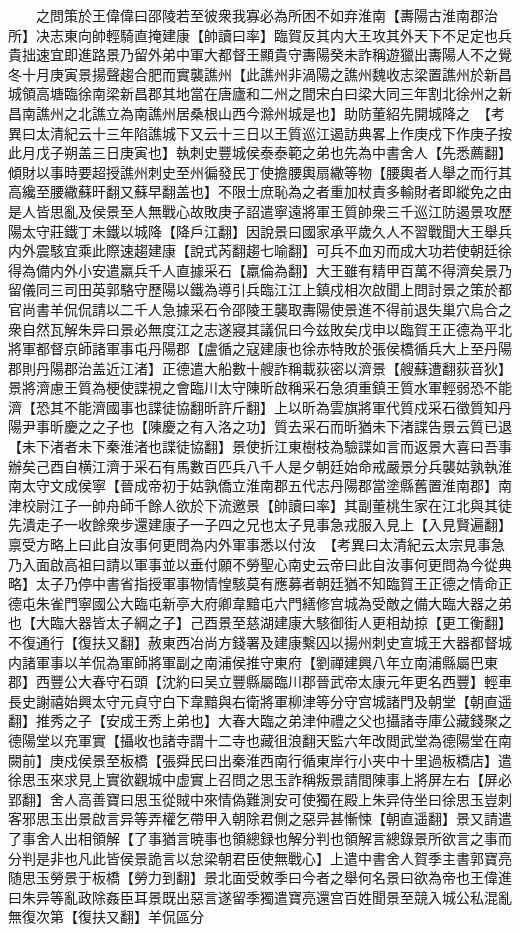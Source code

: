 　　之問策於王偉偉曰邵陵若至彼衆我寡必為所困不如弃淮南【夀陽古淮南郡治所】决志東向帥輕騎直掩建康【帥讀曰率】臨賀反其内大王攻其外天下不足定也兵貴拙速宜即進路景乃留外弟中軍大都督王顯貴守夀陽癸未詐稱遊獵出夀陽人不之覺冬十月庚寅景揚聲趨合肥而實襲譙州【此譙州非渦陽之譙州魏收志梁置譙州於新昌城領高塘臨徐南梁新昌郡其地當在唐廬和二州之間宋白曰梁大同三年割北徐州之新昌南譙州之北譙立為南譙州居桑根山西今滁州城是也】助防董紹先開城降之　【考異曰太清紀云十三年陷譙城下又云十三日以王質巡江遏訪典畧上作庚戍下作庚子按此月戊子朔盖三日庚寅也】執刺史豐城侯泰泰範之弟也先為中書舍人【先悉薦翻】傾財以事時要超授譙州刺史至州徧發民丁使擔腰輿扇繖等物【腰輿者人舉之而行其高纔至腰繖蘇旰翻又蘇早翻盖也】不限士庶恥為之者重加杖責多輸財者即縱免之由是人皆思亂及侯景至人無戰心故敗庚子詔遣寧遠將軍王質帥衆三千巡江防遏景攻歷陽太守莊鐵丁未鐵以城降【降戶江翻】因說景曰國家承平歲久人不習戰聞大王舉兵内外震駭宜乘此際速趨建康【說式芮翻趨七喻翻】可兵不血刃而成大功若使朝廷徐得為備内外小安遣羸兵千人直據采石【羸倫為翻】大王雖有精甲百萬不得濟矣景乃留儀同三司田英郭駱守歷陽以鐵為導引兵臨江江上鎮戍相次啟聞上問討景之策於都官尚書羊侃侃請以二千人急據采石令邵陵王襲取夀陽使景進不得前退失巢穴烏合之衆自然瓦解朱异曰景必無度江之志遂寢其議侃曰今兹敗矣戊申以臨賀王正德為平北將軍都督京師諸軍事屯丹陽郡【盧循之寇建康也徐赤特敗於張侯橋循兵大上至丹陽郡則丹陽郡治盖近江渚】正德遣大船數十艘詐稱載荻密以濟景【艘蘇遭翻荻音狄】景將濟慮王質為梗使諜視之會臨川太守陳昕啟稱采石急須重鎮王質水軍輕弱恐不能濟【恐其不能濟國事也諜徒協翻昕許斤翻】上以昕為雲旗將軍代質戍采石徵質知丹陽尹事昕慶之之子也【陳慶之有入洛之功】質去采石而昕猶未下渚諜告景云質已退【未下渚者未下秦淮渚也諜徒協翻】景使折江東樹枝為驗諜如言而返景大喜曰吾事辦矣己酉自横江濟于采石有馬數百匹兵八千人是夕朝廷始命戒嚴景分兵襲姑孰執淮南太守文成侯寧【晉成帝初于姑孰僑立淮南郡五代志丹陽郡當塗縣舊置淮南郡】南津校尉江子一帥舟師千餘人欲於下流邀景【帥讀曰率】其副董桃生家在江北與其徒先潰走子一收餘衆步還建康子一子四之兄也太子見事急戎服入見上【入見賢遍翻】禀受方略上曰此自汝事何更問為内外軍事悉以付汝　【考異曰太清紀云太宗見事急乃入面啟高祖曰請以軍事並以垂付願不勞聖心南史云帝曰此自汝事何更問為今從典略】太子乃停中書省指授軍事物情惶駭莫有應募者朝廷猶不知臨賀王正德之情命正德屯朱雀門寧國公大臨屯新亭大府卿韋黯屯六門繕修宫城為受敵之備大臨大器之弟也【大臨大器皆太子綱之子】己酉景至慈湖建康大駭御街人更相劫掠【更工衡翻】不復通行【復扶又翻】赦東西冶尚方錢署及建康繫囚以揚州刺史宣城王大器都督城内諸軍事以羊侃為軍師將軍副之南浦侯推守東府【劉禪建興八年立南浦縣屬巴東郡】西豐公大春守石頭【沈約曰吴立豐縣屬臨川郡晉武帝太康元年更名西豐】輕車長史謝禧始興太守元貞守白下韋黯與右衛將軍柳津等分守宫城諸門及朝堂【朝直遥翻】推秀之子【安成王秀上弟也】大春大臨之弟津仲禮之父也攝諸寺庫公藏錢聚之德陽堂以充軍實【攝收也諸寺謂十二寺也藏徂浪翻天監六年改閲武堂為德陽堂在南闕前】庚戍侯景至板橋【張舜民曰出秦淮西南行循東岸行小夹中十里過板橋店】遣徐思玉來求見上實欲觀城中虚實上召問之思玉詐稱叛景請間陳事上將屏左右【屏必郢翻】舍人高善寶曰思玉從賊中來情偽難測安可使獨在殿上朱异侍坐曰徐思玉豈刺客邪思玉出景啟言异等弄權乞帶甲入朝除君側之惡异甚慚悚【朝直遥翻】景又請遣了事舍人出相領解【了事猶言暁事也領總録也解分判也領解言總錄景所欲言之事而分判是非也凡此皆侯景詭言以怠梁朝君臣使無戰心】上遣中書舍人賀季主書郭寶亮随思玉勞景于板橋【勞力到翻】景北面受敇季曰今者之舉何名景曰欲為帝也王偉進曰朱异等亂政除姦臣耳景既出惡言遂留季獨遣寶亮還宫百姓聞景至競入城公私混亂無復次第【復扶又翻】羊侃區分
